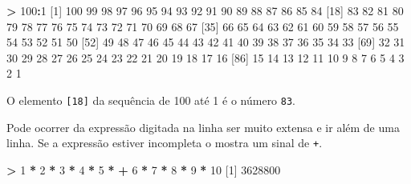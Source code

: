 \documentclass[]{book}
\newenvironment{Shaded}{\begin{snugshade}}{\end{snugshade}}
\newcommand{\DecValTok}[1]{\textcolor[rgb]{0.00,0.00,0.81}{#1}}
\newcommand{\StringTok}[1]{\textcolor[rgb]{0.31,0.60,0.02}{#1}}
\newcommand{\OperatorTok}[1]{\textcolor[rgb]{0.81,0.36,0.00}{\textbf{#1}}}
\newcommand{\NormalTok}[1]{#1}
\begin{document}
\begin{Shaded}
\begin{Highlighting}[]
\OperatorTok{>}\StringTok{ }\DecValTok{100}\OperatorTok{:}\DecValTok{1}
\NormalTok{  [}\DecValTok{1}\NormalTok{] }\DecValTok{100}  \DecValTok{99}  \DecValTok{98}  \DecValTok{97}  \DecValTok{96}  \DecValTok{95}  \DecValTok{94}  \DecValTok{93}  \DecValTok{92}  \DecValTok{91}  \DecValTok{90}  \DecValTok{89}  \DecValTok{88}  \DecValTok{87}  \DecValTok{86}  \DecValTok{85}  \DecValTok{84}
\NormalTok{ [}\DecValTok{18}\NormalTok{]  }\DecValTok{83}  \DecValTok{82}  \DecValTok{81}  \DecValTok{80}  \DecValTok{79}  \DecValTok{78}  \DecValTok{77}  \DecValTok{76}  \DecValTok{75}  \DecValTok{74}  \DecValTok{73}  \DecValTok{72}  \DecValTok{71}  \DecValTok{70}  \DecValTok{69}  \DecValTok{68}  \DecValTok{67}
\NormalTok{ [}\DecValTok{35}\NormalTok{]  }\DecValTok{66}  \DecValTok{65}  \DecValTok{64}  \DecValTok{63}  \DecValTok{62}  \DecValTok{61}  \DecValTok{60}  \DecValTok{59}  \DecValTok{58}  \DecValTok{57}  \DecValTok{56}  \DecValTok{55}  \DecValTok{54}  \DecValTok{53}  \DecValTok{52}  \DecValTok{51}  \DecValTok{50}
\NormalTok{ [}\DecValTok{52}\NormalTok{]  }\DecValTok{49}  \DecValTok{48}  \DecValTok{47}  \DecValTok{46}  \DecValTok{45}  \DecValTok{44}  \DecValTok{43}  \DecValTok{42}  \DecValTok{41}  \DecValTok{40}  \DecValTok{39}  \DecValTok{38}  \DecValTok{37}  \DecValTok{36}  \DecValTok{35}  \DecValTok{34}  \DecValTok{33}
\NormalTok{ [}\DecValTok{69}\NormalTok{]  }\DecValTok{32}  \DecValTok{31}  \DecValTok{30}  \DecValTok{29}  \DecValTok{28}  \DecValTok{27}  \DecValTok{26}  \DecValTok{25}  \DecValTok{24}  \DecValTok{23}  \DecValTok{22}  \DecValTok{21}  \DecValTok{20}  \DecValTok{19}  \DecValTok{18}  \DecValTok{17}  \DecValTok{16}
\NormalTok{ [}\DecValTok{86}\NormalTok{]  }\DecValTok{15}  \DecValTok{14}  \DecValTok{13}  \DecValTok{12}  \DecValTok{11}  \DecValTok{10}   \DecValTok{9}   \DecValTok{8}   \DecValTok{7}   \DecValTok{6}   \DecValTok{5}   \DecValTok{4}   \DecValTok{3}   \DecValTok{2}   \DecValTok{1}
\end{Highlighting}
\end{Shaded}

O elemento \texttt{{[}18{]}} da sequência de 100 até 1 é o número
\texttt{83}.

Pode ocorrer da expressão digitada na linha ser muito extensa e ir além
de uma linha. Se a expressão estiver incompleta o mostra um sinal de
\texttt{+}.

\begin{Shaded}
\begin{Highlighting}[]
\OperatorTok{>}\StringTok{ }\DecValTok{1} \OperatorTok{*}\StringTok{ }\DecValTok{2} \OperatorTok{*}\StringTok{ }\DecValTok{3} \OperatorTok{*}\StringTok{ }\DecValTok{4} \OperatorTok{*}\StringTok{ }\DecValTok{5} \OperatorTok{*}
\OperatorTok{+}\StringTok{ }\DecValTok{6} \OperatorTok{*}\StringTok{ }\DecValTok{7} \OperatorTok{*}\StringTok{ }\DecValTok{8} \OperatorTok{*}\StringTok{ }\DecValTok{9} \OperatorTok{*}\StringTok{ }\DecValTok{10}
\NormalTok{[}\DecValTok{1}\NormalTok{] }\DecValTok{3628800}
\end{Highlighting}
\end{Shaded}
\end{document}
